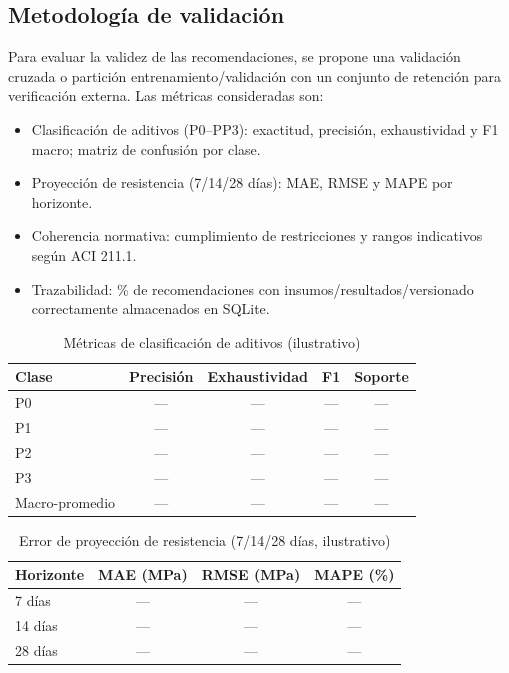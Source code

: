 \documentclass[12pt, letterpaper]{article}
\begin{document}
\subsection{Metodología de validación}
Para evaluar la validez de las recomendaciones, se propone una validación cruzada o partición entrenamiento/validación con un conjunto de retención para verificación externa. Las métricas consideradas son:
\begin{itemize}
  \item Clasificación de aditivos (P0–PP3): exactitud, precisión, exhaustividad y F1 macro; matriz de confusión por clase.
  \item Proyección de resistencia (7/14/28 días): MAE, RMSE y MAPE por horizonte.
  \item Coherencia normativa: cumplimiento de restricciones y rangos indicativos según ACI 211.1.
  \item Trazabilidad: \% de recomendaciones con insumos/resultados/versionado correctamente almacenados en SQLite.
\end{itemize}

\begin{table}[H]
  \centering
  \caption{Métricas de clasificación de aditivos (ilustrativo)}
  \begin{tabular}{lcccc}
    \hline
    Clase & Precisión & Exhaustividad & F1 & Soporte \\
    \hline
    P0 & — & — & — & — \\
    P1 & — & — & — & — \\
    P2 & — & — & — & — \\
    P3 & — & — & — & — \\
    Macro-promedio & — & — & — & — \\
    \hline
  \end{tabular}
\end{table}

\begin{table}[H]
  \centering
  \caption{Error de proyección de resistencia (7/14/28 días, ilustrativo)}
  \begin{tabular}{lccc}
    \hline
    Horizonte & MAE (MPa) & RMSE (MPa) & MAPE (\%) \\
    \hline
    7 días & — & — & — \\
    14 días & — & — & — \\
    28 días & — & — & — \\
    \hline
  \end{tabular}
\end{table}
\end{document}
